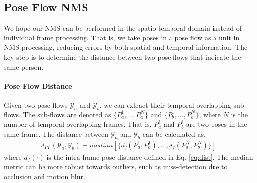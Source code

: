 \documentclass{bmvc2k}
\begin{document}
\subsection{Pose Flow NMS}
We hope our NMS can be performed in the spatio-temporal domain instead of individual frame processing. That is, we take poses in a pose flow as a unit in NMS processing, reducing errors by both spatial and temporal information. The key step is to determine the distance between two pose flows that indicate the same person.

\vspace{-4mm}
\paragraph{Pose Flow Distance}
Given two pose flows $\mathcal{Y}_a$ and $\mathcal{Y}_b$, we can extract their temporal overlapping sub-flows. The sub-flows are denoted as $\{P_a^1,\ldots, P_a^N\}$ and $\{P_b^1,\ldots,P_b^N\}$, where $N$ is the number of temporal overlapping frames. That is, $P_a^i$ and $P_b^i$ are two poses in the same frame. The distance between $\mathcal{Y}_a$ and $\mathcal{Y}_b$ can be calculated as,
\begin{equation}
\begin{split}
d_{PF}(\mathcal{Y}_a, \mathcal{Y}_b) = median[\{d_f(P_a^1, P_b^1),\ldots,d_f(P_a^N, P_b^N)\}]
\end{split}
\end{equation}
where $d_f(\cdot)$ is the intra-frame pose distance defined in Eq. \ref{eq:dist}. The median metric can be more robust towards outliers, such as miss-detection due to occlusion and motion blur.
\vspace{-3mm}
\end{document}
